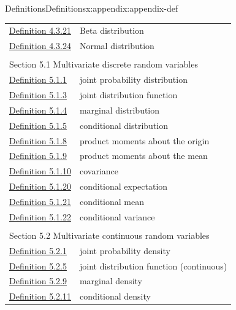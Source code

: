 \documentclass[oneside,10pt,]{book}
\numberwithin{equation}{section}
\begin{document}
\begin{appendixptx}{Definitions}{}{Definitions}{}{}{x:appendix:appendix-def}
\begin{longtable}[l]{ll}
\hyperref[x:definition:def-cont-beta]{Definition 4.3.21}& Beta distribution\\
\hyperref[x:definition:def-cont-normal]{Definition 4.3.24}& Normal distribution\\
\multicolumn{2}{l}{\null}\\[1.5ex] \multicolumn{2}{l}{\large Section 5.1 Multivariate discrete random variables}\\[0.5ex]
\hyperref[x:definition:def-joint-probability-distribution-3-6]{Definition 5.1.1}& joint probability distribution\\
\hyperref[x:definition:def-joint-distribution-function-3-7]{Definition 5.1.3}& joint distribution function\\
\hyperref[x:definition:def-marginal-distribution-3-10]{Definition 5.1.4}& marginal distribution\\
\hyperref[x:definition:def-conditional-distribution-3-10]{Definition 5.1.5}& conditional distribution\\
\hyperref[x:definition:def-product-moments-origin-4-7]{Definition 5.1.8}& product moments about the origin\\
\hyperref[x:definition:def-product-moments-mean-4-8]{Definition 5.1.9}& product moments about the mean\\
\hyperref[x:definition:def-covariance-4-9]{Definition 5.1.10}& covariance\\
\hyperref[x:definition:def-conditional-expectation-4-10]{Definition 5.1.20}& conditional expectation\\
\hyperref[x:definition:def-conditional-mean]{Definition 5.1.21}& conditional mean\\
\hyperref[x:definition:def-conditional-variance]{Definition 5.1.22}& conditional variance\\
\multicolumn{2}{l}{\null}\\[1.5ex] \multicolumn{2}{l}{\large Section 5.2 Multivariate continuous random variables}\\[0.5ex]
\hyperref[x:definition:def-joint-probability-density-3-6-cont]{Definition 5.2.1}& joint probability density\\
\hyperref[x:definition:def-joint-density-function-3-7-cont]{Definition 5.2.5}& joint distribution function (continuous)\\
\hyperref[x:definition:def-marginal-density-3-10-cont]{Definition 5.2.9}& marginal density\\
\hyperref[x:definition:def-conditional-density-3-10-cont]{Definition 5.2.11}& conditional density\\

\end{longtable}
\end{appendixptx}
\end{document}
